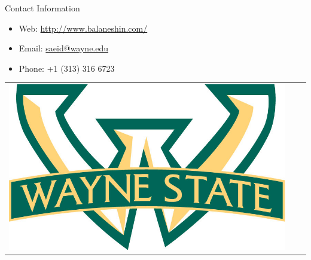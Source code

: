 \documentclass[final]{beamer}
\newlength{\onecolwid}
\begin{document}
\begin{frame}[t]
\begin{columns}[t]
\begin{column}{\onecolwid}

\begin{alertblock}{Contact Information}

\begin{itemize}
\item Web: \href{http://www.balaneshin.com/}{http://www.balaneshin.com/}
\item Email: \href{mailto:saeid@wayne.edu}{saeid@wayne.edu}
\item Phone: +1 (313) 316 6723
\end{itemize}

\end{alertblock}

\begin{center}
\begin{tabular}{ccc}
\includegraphics[width=0.3\linewidth]{images/warrior_banded_logo.jpg} & \hfill & %
\end{tabular}
\end{center}


\end{column} %

\end{columns} %

\end{frame} %
\end{document}

